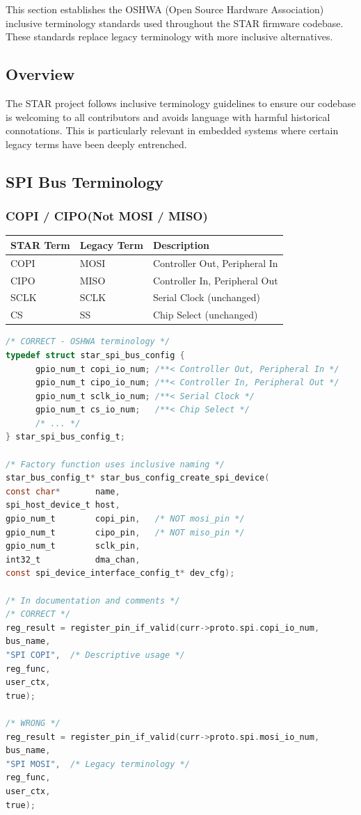 This section establishes the OSHWA (Open Source Hardware Association) inclusive terminology standards used throughout the STAR firmware codebase. These standards replace legacy terminology with more inclusive alternatives.

\subsection{Overview}

The STAR project follows inclusive terminology guidelines to ensure our codebase is welcoming to all contributors and avoids language with harmful historical connotations. This is particularly relevant in embedded systems where certain legacy terms have been deeply entrenched.

\subsection{SPI Bus Terminology}

\subsubsection{COPI / CIPO(Not MOSI / MISO)}

\begin{center}
\begin{tabular}{|l|l|l|}
\hline
\textbf{STAR Term} & \textbf{Legacy Term} & \textbf{Description} \\
\hline
COPI & MOSI & Controller Out, Peripheral In \\
\hline
CIPO & MISO & Controller In, Peripheral Out \\
\hline
SCLK & SCLK & Serial Clock (unchanged) \\
\hline
CS & SS & Chip Select (unchanged) \\
\hline
\end{tabular}
\end{center}

\begin{lstlisting}[language=C]
/* CORRECT - OSHWA terminology */
typedef struct star_spi_bus_config {
      gpio_num_t copi_io_num; /**< Controller Out, Peripheral In */
      gpio_num_t cipo_io_num; /**< Controller In, Peripheral Out */
      gpio_num_t sclk_io_num; /**< Serial Clock */
      gpio_num_t cs_io_num;   /**< Chip Select */
      /* ... */
} star_spi_bus_config_t;

/* Factory function uses inclusive naming */
star_bus_config_t* star_bus_config_create_spi_device(
const char*       name,
spi_host_device_t host,
gpio_num_t        copi_pin,   /* NOT mosi_pin */
gpio_num_t        cipo_pin,   /* NOT miso_pin */
gpio_num_t        sclk_pin,
int32_t           dma_chan,
const spi_device_interface_config_t* dev_cfg);

/* In documentation and comments */
/* CORRECT */
reg_result = register_pin_if_valid(curr->proto.spi.copi_io_num,
bus_name,
"SPI COPI",  /* Descriptive usage */
reg_func,
user_ctx,
true);

/* WRONG */
reg_result = register_pin_if_valid(curr->proto.spi.mosi_io_num,
bus_name,
"SPI MOSI",  /* Legacy terminology */
reg_func,
user_ctx,
true);
\end{lstlisting}

